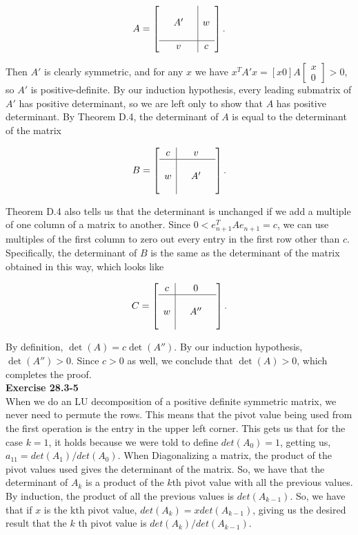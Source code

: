\documentclass{article}
\begin{document}
\[A = \left[ \begin{array}{ccc|c} & & & \\  & A' & & w \\ & & & \\ \hline & v & & c\end{array} \right]. \]

Then $A'$ is clearly symmetric, and for any $x$ we have $x^T A' x = [x 0] A \left[ \begin{array}{c} x \\ 0 \end{array} \right] > 0$, so $A'$ is positive-definite.  By our induction hypothesis, every leading submatrix of $A'$ has positive determinant, so we are left only to show that $A$ has positive determinant.  By Theorem D.4, the determinant of $A$ is equal to the determinant of the matrix 

\[ B = \left[ \begin{array}{c|ccc}  c &  & v & \\ \hline & & & \\  w & & A' &  \\ & &  & \\ \end{array} \right]. \]

Theorem D.4 also tells us that  the determinant is unchanged if we add a multiple of one column of a matrix to another.  Since $0 < e_{n+1}^T A e_{n+1} = c$, we can use multiples of the first column to zero out every entry in the first row other than $c$.  Specifically, the determinant of $B$ is the same as the determinant of the matrix obtained in this way, which looks like

\[C = \left[ \begin{array}{c|ccc}  c &  & 0 & \\ \hline & & & \\  w & & A'' &  \\ & &  & \\ \end{array} \right]. \]

By definition, $\det(A) = c\det(A'')$.  By our induction hypothesis, $\det(A'') > 0$.  Since $c > 0$ as well, we conclude that $\det(A) > 0$, which completes the proof. \\

\noindent\textbf{Exercise 28.3-5}\\
When we do an LU decomposition of a positive definite symmetric matrix, we never need to permute the rows. This means that the pivot value being used from the first operation is the entry in the upper left corner. This gets us that for the case $k=1$, it holds because we were told to define $det(A_0) =1$, getting us, $a_{11} = det(A_1)/det(A_0)$. When Diagonalizing a matrix, the product of the pivot values used gives the determinant of the matrix. So, we have that the determinant of $A_k$ is a product of the $k$th pivot value with all the previous values. By induction, the product of all the previous values is $det(A_{k-1})$. So, we have that if $x$ is the kth pivot value, $det(A_k) = x det(A_{k-1})$, giving us the desired result that the $k$ th pivot value is $det(A_{k})/det(A_{k-1})$.\\
\end{document}
